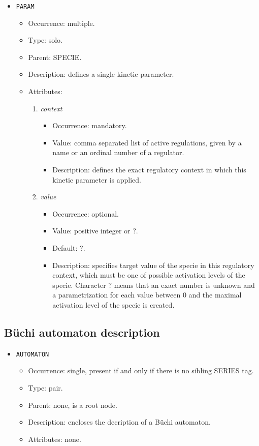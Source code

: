 \documentclass[12pt]{article}
\newenvironment{menum}{
\begin{enumerate}
  \setlength{\itemsep}{0pt}
  \setlength{\parskip}{0pt}
  \setlength{\parsep}{0pt}
}{\end{enumerate}}
\newenvironment{mitem}{
\begin{itemize}
  \setlength{\itemsep}{0pt}
  \setlength{\parskip}{0pt}
  \setlength{\parsep}{0pt}
}{\end{itemize}}
\begin{document}
\begin{mitem}
	\item \texttt{PARAM}
	\begin{mitem}
		\item Occurrence: multiple.
		\item Type: solo.
		\item Parent: SPECIE.
		\item Description: defines a single kinetic parameter.
		\item Attributes:	
		\begin{menum}
			\item \textit{context} 
			\begin{mitem}
				\item Occurrence: mandatory.
				\item Value: comma separated list of active regulations, given by a name or an ordinal number of a regulator.
				\item Description: defines the exact regulatory context in which this kinetic parameter is applied.
			\end{mitem}
			\item \textit{value} 
			\begin{mitem}
				\item Occurrence: optional.
				\item Value: positive integer or ?.
				\item Default: ?.
				\item Description: specifies target value of the specie in this regulatory context, which must be one of possible activation levels of the specie. Character ? means that an exact number is unknown and a parametrization for each value between 0 and the maximal activation level of the specie is created.
			\end{mitem}
		\end{menum}
	\end{mitem}
\end{mitem}
	
\subsection{B\"uchi automaton description}		
\begin{mitem}
	\item \texttt{AUTOMATON}
	\begin{mitem}
		\item Occurrence: single, present if and only if there is no sibling SERIES tag.
		\item Type: pair.
		\item Parent: none, is a root node.
		\item Description: encloses the decription of a B\"uchi automaton.
		\item Attributes: none.
	\end{mitem}
\end{mitem}		
\end{document}
